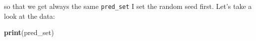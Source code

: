 \documentclass[]{gitbook}
\newenvironment{Shaded}{\begin{snugshade}}{\end{snugshade}}
\newcommand{\DecValTok}[1]{\textcolor[rgb]{0.00,0.00,0.81}{#1}}
\newcommand{\KeywordTok}[1]{\textcolor[rgb]{0.13,0.29,0.53}{\textbf{#1}}}
\newcommand{\NormalTok}[1]{#1}
\newcommand{\OperatorTok}[1]{\textcolor[rgb]{0.81,0.36,0.00}{\textbf{#1}}}
\newcommand{\StringTok}[1]{\textcolor[rgb]{0.31,0.60,0.02}{#1}}
\theoremstyle{definition}
\theoremstyle{definition}
\theoremstyle{definition}
\theoremstyle{remark}
\begin{document}
\begin{Shaded}
\end{Shaded}

so that we get always the same \texttt{pred\_set} I set the random seed
first. Let's take a look at the data:

\begin{Shaded}
\begin{Highlighting}[]
\KeywordTok{print}\NormalTok{(pred_set)}
\end{Highlighting}
\end{Shaded}
\end{document}
